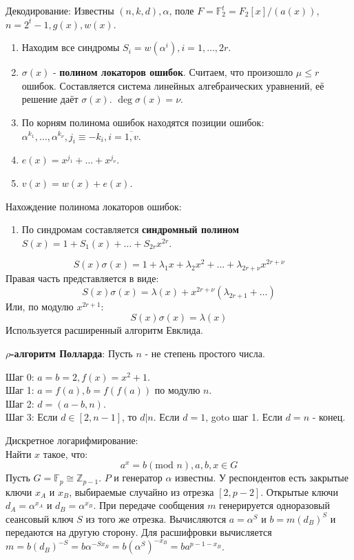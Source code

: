 \documentclass[11pt]{article}
\newcounter{th}\setcounter{th}{0}
\begin{document}
Декодирование:
Известны \((n, k, d), \alpha\), поле \(F = \mathbb{F}_2^t = F_2[x] / (a(x))\), \(n = 2^t - 1, g(x), w(x)\).
\begin{enumerate}
\item Находим все синдромы \(S_i = w(\alpha^i), i = 1, \ldots, 2r\).
\item \(\sigma(x)\) - \textbf{полином локаторов ошибок}. Считаем, что произошло \(\mu \leq r\) ошибок. Составляется система линейных алгебраических уравнений, её решение даёт \(\sigma(x)\). \(\operatorname{deg}\sigma(x) = \nu\).
\item По корням полинома ошибок находятся позиции ошибок: \(\alpha^{k_1}, \ldots, \alpha^{k_{\nu}}, j_i \equiv -k_i, i = \overline{1, v}\).
\item \(e(x) = x^{j_1} + \ldots + x^{j_{\nu}}\).
\item \(v(x) = w(x) + e(x)\).
\end{enumerate}
Нахождение полинома локаторов ошибок:
\begin{enumerate}
\item По синдромам составляется \textbf{синдромный полином} \(S(x) = 1 + S_1(x) + \ldots + S_{2r}x^{2r}\).
\end{enumerate}
$$S(x)\sigma(x) = 1 + \lambda_1x + \lambda_2x^2 + \ldots + \lambda_{2r + \nu}x^{2r + \nu}$$
Правая часть представляется в виде:
$$S(x)\sigma(x) = \lambda(x) + x^{2r + \nu}(\lambda_{2r + 1} + \ldots)$$
Или, по модулю \(x^{2r + 1}\):
$$S(x)\sigma(x) = \lambda(x)$$
Используется расширенный алгоритм Евклида.

\textbf{\(\rho\)-алгоритм Полларда}:
Пусть \(n\) - не степень простого числа.

Шаг 0: \(a = b = 2, f(x) = x^2 + 1\).\\
Шаг 1: \(a = f(a), b = f(f(a))\) по модулю \(n\).\\
Шаг 2: \(d = (a - b, n)\).\\
Шаг 3: Если \(d \in [2, n - 1]\), то \(d | n\). Если \(d = 1\), goto шаг 1. Если \(d = n\) - конец.

Дискретное логарифмирование:\\
Найти \(x\) такое, что:
\begin{equation}
a^x = b (\text{mod } n), a, b, x \in G
\end{equation}
Пусть $G = \mathbb{F}_p \cong \mathbb{Z}_{p - 1}$. $P$ и генератор $\alpha$ известны.
У респондентов есть закрытые ключи \(x_A\) и \(x_B\), выбираемые случайно из отрезка \([2, p - 2]\).
Открытые ключи \(d_A = \alpha^{x_A}\) и \(d_B = \alpha^{x_B}\). При передаче сообщения \(m\) генерируется
одноразовый сеансовый ключ \(S\) из того же отрезка. Вычисляются \(a = \alpha^S\) и \(b = m(d_B)^S\)
и передаются на другую сторону. Для расшифровки вычисляется \(m = b(d_B)^{-S} = b\alpha^{-Sx_B}
= b(\alpha^S)^{-x_B} = ba^{p - 1 - x_B}\).
\end{document}
